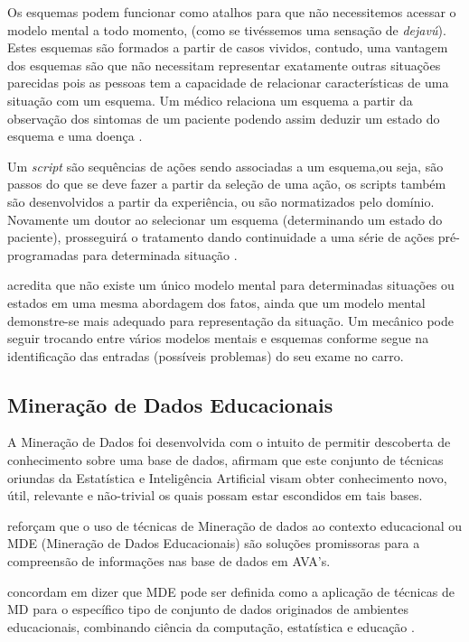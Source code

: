\documentclass[12pt]{article}
\begin{document}
Os esquemas podem funcionar como atalhos para que não necessitemos acessar o modelo mental a todo momento, (como se tivéssemos uma sensação de \textit{dejavú}). Estes esquemas são formados a partir de casos vividos, contudo, uma vantagem dos esquemas são que não necessitam representar exatamente outras situações parecidas pois as pessoas tem a capacidade de relacionar características de uma situação com um esquema. Um médico relaciona um esquema a partir da observação dos sintomas de um paciente podendo assim deduzir um estado do esquema e uma doença \cite{Endsley2012}.

Um \textit{script} são sequências de ações sendo associadas a um esquema,ou seja, são passos do que se deve fazer a partir da seleção de uma ação, os scripts também são desenvolvidos a partir da experiência, ou são normatizados pelo domínio. Novamente um doutor ao selecionar um esquema (determinando um estado do paciente), prosseguirá o tratamento dando continuidade a uma série de ações pré-programadas para determinada situação \cite{Endsley2012}.  

\cite{Moreira1996} acredita que não existe um único modelo mental para determinadas situações ou estados em uma mesma abordagem dos fatos, ainda que um modelo mental demonstre-se mais adequado para representação da situação. Um mecânico pode seguir trocando entre vários modelos mentais e esquemas conforme segue na identificação das entradas (possíveis problemas) do seu exame no carro.

\subsection{Mineração de Dados Educacionais}

A Mineração de Dados foi desenvolvida com o intuito de permitir descoberta de conhecimento sobre uma base de dados, \cite{Goldschmidt_Passos_2005} afirmam que este conjunto de técnicas oriundas da Estatística e Inteligência Artificial visam obter conhecimento novo, útil, relevante e não-trivial os quais possam estar escondidos em tais bases.

\cite{Leite_et_al_2016} reforçam que o uso de técnicas de Mineração de dados ao contexto educacional ou MDE (Mineração de Dados Educacionais) são soluções promissoras para a compreensão de informações nas base de dados em AVA's.

\cite{Romero_Ventura_2013} concordam em dizer que MDE pode ser definida como a aplicação de técnicas de MD para o específico tipo de conjunto de dados originados de ambientes educacionais, combinando ciência da computação, estatística e educação .
\end{document}
